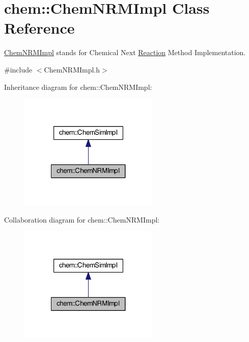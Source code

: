 \hypertarget{classchem_1_1ChemNRMImpl}{\section{chem\-:\-:Chem\-N\-R\-M\-Impl Class Reference}
\label{classchem_1_1ChemNRMImpl}
}


\hyperlink{classchem_1_1ChemNRMImpl}{Chem\-N\-R\-M\-Impl} stands for Chemical Next \hyperlink{classchem_1_1Reaction}{Reaction} Method Implementation.  




{\ttfamily \#include $<$Chem\-N\-R\-M\-Impl.\-h$>$}



Inheritance diagram for chem\-:\-:Chem\-N\-R\-M\-Impl\-:\nopagebreak
\begin{figure}[H]
\begin{center}
\leavevmode
\includegraphics[width=188pt]{classchem_1_1ChemNRMImpl__inherit__graph}
\end{center}
\end{figure}


Collaboration diagram for chem\-:\-:Chem\-N\-R\-M\-Impl\-:\nopagebreak
\begin{figure}[H]
\begin{center}
\leavevmode
\includegraphics[width=188pt]{classchem_1_1ChemNRMImpl__coll__graph}
\end{center}
\end{figure}
